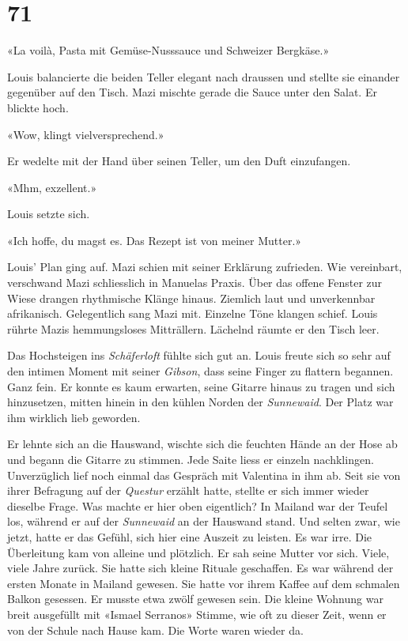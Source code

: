 \chapter{71}



«La voilà, Pasta mit Gemüse-Nusssauce und Schweizer Bergkäse.»

Louis balancierte die beiden Teller elegant nach draussen und stellte
sie einander gegenüber auf den Tisch. Mazi mischte gerade die Sauce
unter den Salat. Er blickte hoch.

«Wow, klingt vielversprechend.»

Er wedelte mit der Hand über seinen Teller, um den Duft einzufangen.

«Mhm, exzellent.»

Louis setzte sich.

«Ich hoffe, du magst es. Das Rezept ist von meiner Mutter.»

Louis’ Plan ging auf. Mazi schien mit seiner Erklärung zufrieden.
Wie vereinbart, verschwand Mazi schliesslich in Manuelas Praxis. Über
das offene Fenster zur Wiese drangen rhythmische Klänge hinaus. Ziemlich
laut und unverkennbar afrikanisch. Gelegentlich sang Mazi mit. Einzelne
Töne klangen schief. Louis rührte Mazis hemmungsloses Mitträllern.
Lächelnd räumte er den Tisch leer.

Das Hochsteigen ins \emph{Schäferloft} fühlte sich gut an. Louis
freute sich so sehr auf den intimen Moment mit seiner \emph{Gibson},
dass seine Finger zu flattern begannen. Ganz fein. Er konnte es kaum
erwarten, seine Gitarre hinaus zu tragen und sich hinzusetzen, mitten hinein 
in den kühlen Norden der \emph{Sunnewaid}. Der Platz war ihm wirklich lieb  
geworden. 

Er lehnte sich an die Hauswand, wischte sich die feuchten Hände an
der Hose ab und begann die Gitarre zu stimmen. Jede Saite liess er einzeln nachklingen. Unverzüglich lief noch einmal das Gespräch mit Valentina in ihm ab.
Seit sie von ihrer Befragung auf der \emph{Questur} erzählt hatte, stellte 
er sich immer wieder dieselbe Frage. Was machte er hier oben eigentlich? 
In Mailand war der Teufel los, während er auf der \emph{Sunnewaid} an der Hauswand stand. Und selten zwar, wie jetzt, hatte er das Gefühl, sich hier eine Auszeit zu leisten. Es war irre. Die Überleitung kam von alleine und plötzlich. Er sah seine Mutter vor sich. Viele, viele Jahre zurück. Sie hatte sich kleine Rituale geschaffen.
Es war während der ersten Monate in Mailand gewesen. Sie hatte vor ihrem Kaffee auf dem schmalen Balkon gesessen. Er musste etwa zwölf gewesen sein. Die kleine Wohnung war breit ausgefüllt mit «Ismael Serranos» Stimme, wie oft zu dieser Zeit, wenn er von der Schule nach Hause kam. Die Worte waren wieder da. 

